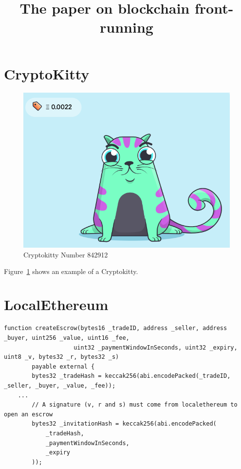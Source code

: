 \documentclass[envcountsect]{llncs}
\begin{document}
\frontmatter
\mainmatter

\title{The paper on blockchain front-running}
\author{}
\institute{}
\maketitle








\clearpage



\appendix

\section{CryptoKitty} \label{app:cryptokitty}

\begin{figure}[!htb]
\centering
\includegraphics[width=0.3\linewidth]{figures/cryptokittie842912.png}
\caption{ Cryptokitty Number 842912 \label{fig:cryptokittie}}
\end{figure}

Figure~\ref{fig:cryptokittie} shows an example of a Cryptokitty.


\section{LocalEthereum} \label{app:code}

\begin{lstlisting}[basicstyle=\scriptsize\ttfamily,caption={Code snippet from LocalEthereum smart contract. Values V,R and S are set by LocalEtherem to have a valid signature, also the tradeHash uses buyer and seller addresses, mitigating the possibility of front-running by a third party.},label={code:localethereum}]
    function createEscrow(bytes16 _tradeID, address _seller, address _buyer, uint256 _value, uint16 _fee,
					uint32 _paymentWindowInSeconds, uint32 _expiry, uint8 _v, bytes32 _r, bytes32 _s) 
        payable external {
        bytes32 _tradeHash = keccak256(abi.encodePacked(_tradeID, _seller, _buyer, _value, _fee));
	...
        // A signature (v, r and s) must come from localethereum to open an escrow
        bytes32 _invitationHash = keccak256(abi.encodePacked(
            _tradeHash,
            _paymentWindowInSeconds,
            _expiry
        )); 
\end{lstlisting}
\end{document}
